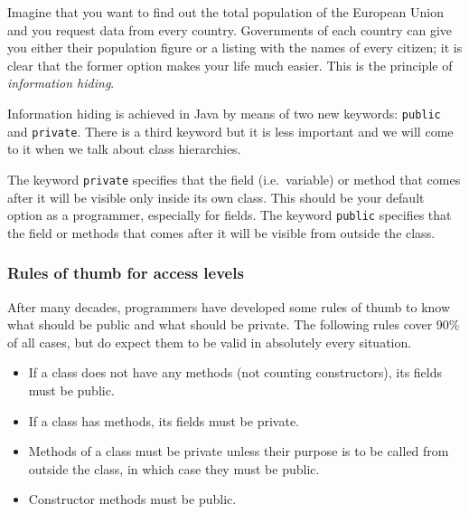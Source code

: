 Imagine that you want to find out the total population of the European
Union and you request data from every country. Governments of each
country can give you either their population figure or a listing with
the names of every citizen; it is clear that the former option makes
your life much easier. This is the principle of \emph{information
  hiding}. 

Information hiding is achieved in Java by means of two new keywords:
\verb+public+ and \verb+private+. There is a third keyword but it is
less important and we will come to it when we talk about class
hierarchies. 

The keyword \verb+private+ specifies that the field (i.e.~variable) or
method that comes after it will be visible only inside its own
class. This should be your default option as a programmer, especially
for fields. The keyword \verb+public+ specifies that the field or
methods that comes after it will be visible from outside the class. 


\subsubsection*{Rules of thumb for access levels}
\label{sec:rules-thumb-access}

After many decades, programmers have developed some rules of thumb
to know what should be public and what should be private. The
following rules cover 90\% of all cases, but do expect them to be
valid in absolutely every situation. 

\begin{itemize}
\item If a class does not have any methods (not counting
  constructors), its fields must be public.
\item If a class has methods, its fields must be private.
\item Methods of a class must be private unless their purpose is to be
  called from outside the class, in which case they must be public.
\item Constructor methods must be public. 
\end{itemize}


